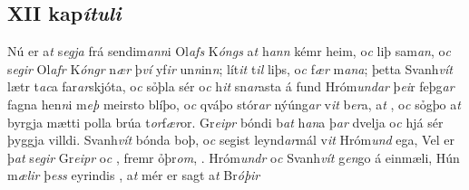 \beginnumbering \pstart  
\vspace{5mm}\subsection*{XII kap\textit{ítuli}} 
Nú er a\textit{t} s\textit{egja} frá sendim\textit{ann}i
Ol\textit{afs} K\textit{óngs} a\textit{t} h\textit{ann} kémr heim,  o\textit{c}  liþ sam\textit{an}, o\textit{c} s\textit{egir} Ol\textit{afr}
K\textit{óngr} n\textit{ær} þ\textit{ví} yf\textit{ir}
un\textit{n}in\textit{n};   lít\textit{it} t\textit{il} liþs, o\textit{c} f\textit{ær}  m\textit{ana}; þetta   Svanh\textit{vít}  lætr t\textit{ac}a   far\textit{ar}skjóta, o\textit{c} sỏþla sér o\textit{c}  h\textit{it} sn\textit{ar}asta á fund Hróm\textit{undar}
þ\textit{ei}r feþg\textit{ar} fagna hen\textit{n}i m\textit{eþ} meirsto blíþo, o\textit{c} qváþo stór\textit{ar} nýúng\textit{ar}
v\textit{it} b\textit{er}a, a\textit{t}   , o\textit{c} sỏgþo a\textit{t} byrgja mætti  polla   brúa t\textit{or}f\textit{ær}or. Gr\textit{eipr} bóndi b\textit{at}
h\textit{an}a þ\textit{ar} dvelja  o\textit{c} hjá sér   þyggja   villdi. Svanh\textit{vít}  bónda   boþ, o\textit{c} segist leynd\textit{ar}mál v\textit{it} Hróm\textit{und} ega, 
Vel er þ\textit{at} s\textit{egir} Gr\textit{eipr} o\textit{c}  
, fremr ỏþr\textit{om},  . Hróm\textit{undr} o\textit{c} Svanh\textit{vít} g\textit{en}go    á einmæli,  Hún m\textit{ælir} þ\textit{ess} eyrindis  , a\textit{t} mér er  sagt a\textit{t} Br\textit{óþir}
